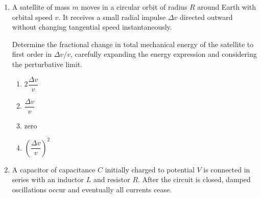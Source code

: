 \documentclass[12pt]{article}
\begin{document}
\begin{enumerate}

\begin{enumerate}
\item $\dfrac{F + \sqrt{F^2 + \tfrac{1}{2}kmv^2}}{k}$
\item $\dfrac{F - \sqrt{F^2 + \tfrac{1}{2}kmv^2}}{k}$
\item $\sqrt{\dfrac{mv^2}{2k}}$
\item $\dfrac{\sqrt{F^2 + kmv^2}}{k}$
\end{enumerate}

\item
A satellite of mass $m$ moves in a circular orbit of radius $R$ around Earth with orbital speed $v$. It receives a small radial impulse $\Delta v$ directed outward without changing tangential speed instantaneously.

Determine the fractional change in total mechanical energy of the satellite to first order in $\Delta v/v$, carefully expanding the energy expression and considering the perturbative limit.

\begin{enumerate}
\item $2\dfrac{\Delta v}{v}$
\item $\dfrac{\Delta v}{v}$
\item zero
\item $\left(\dfrac{\Delta v}{v}\right)^2$
\end{enumerate}
\item
A capacitor of capacitance $C$ initially charged to potential $V$ is connected in series with an inductor $L$ and resistor $R$. After the circuit is closed, damped oscillations occur and eventually all currents cease.


\end{enumerate}
\end{document}
